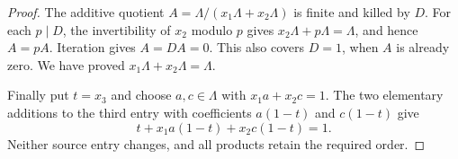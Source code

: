 \begin{proof}
The additive quotient
$A=\Lambda/(x_1\Lambda+x_2\Lambda)$ is finite and killed by $D$.
For each $p\mid D$, the invertibility of $x_2$ modulo $p$ gives
$x_2\Lambda+p\Lambda=\Lambda$, and hence $A=pA$.  Iteration gives
$A=DA=0$.  This also covers $D=1$, when $A$ is already zero.
We have proved $x_1\Lambda+x_2\Lambda=\Lambda$.

Finally put $t=x_3$ and choose $a,c\in\Lambda$ with $x_1a+x_2c=1$.  The two
elementary additions to the third entry with coefficients
$a(1-t)$ and $c(1-t)$ give
\[
  t+x_1a(1-t)+x_2c(1-t)=1.
\]
Neither source entry changes, and all products retain the required
order.
\end{proof}
